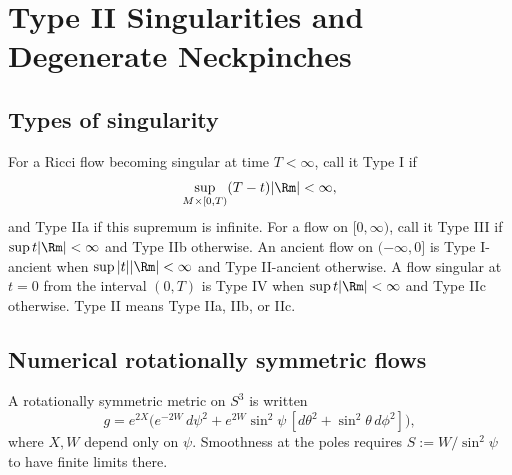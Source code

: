 \chapter[36]{Type II Singularities and Degenerate Neckpinches}
\label{ch:chow-iv-type-ii-degenerate-neckpinches}

\section{Types of singularity}

\begin{definition}
\label{def:chow-iv-singularity-types}
For a Ricci flow becoming singular at time $T<\infty$, call it Type I if
\[
 \sup_{M\times[0,T)}(T-t)|\Rm|<\infty,
\]
and Type IIa if this supremum is infinite.  For a flow on
$[0,\infty)$, call it Type III if $\sup t|\Rm|<\infty$ and Type IIb
otherwise.  An ancient flow on $(-\infty,0]$ is Type I-ancient when
$\sup |t||\Rm|<\infty$ and Type II-ancient otherwise.  A flow singular at
$t=0$ from the interval $(0,T)$ is Type IV when $\sup t|\Rm|<\infty$ and
Type IIc otherwise.  Type II means Type IIa, IIb, or IIc.
\end{definition}

\section{Numerical rotationally symmetric flows}

\begin{definition}
\label{def:chow-iv-rotational-s3-metric}
A rotationally symmetric metric on $S^3$ is written
\[
 g=e^{2X}\bigl(e^{-2W}\,d\psi^2+e^{2W}\sin^2\psi\,[d\theta^2+
 \sin^2\theta\,d\phi^2]\bigr),
\]
where $X,W$ depend only on $\psi$.  Smoothness at the poles requires
$S:=W/\sin^2\psi$ to have finite limits there.
\end{definition}

